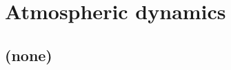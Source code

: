 
\cleardoublepage


\chapter{Atmospheric dynamics}\label{ch:atmospheric-dynamics}

\hfill \break

\newpage

\section{(none)}


